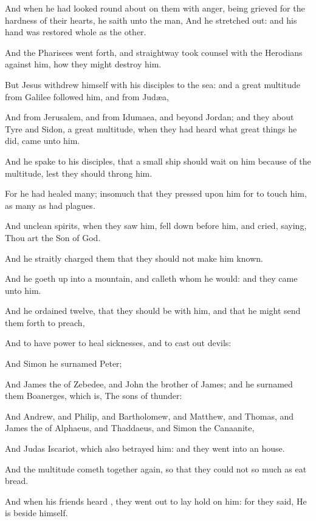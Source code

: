 {And when he had looked round
about on
them
with
anger, being
grieved
for the
hardness
of
their
hearts, he
saith unto the
man,
{}
And he
stretched
{}
out:
and
his
hand was
restored
whole
as the
other.

And the
Pharisees went
forth, and
straightway
took
counsel
with the
Herodians
against
him,
how they might
destroy
him.

But
Jesus withdrew
himself
with
his
disciples
to the
sea:
and a
great
multitude
from
Galilee
followed
him,
and
from
Judæa,

And
from
Jerusalem,
and
from
Idumaea,
and
{}
beyond
Jordan;
and
they
about
Tyre
and
Sidon, a
great
multitude, when they had
heard what great
things he
did,
came
unto
him.

And he
spake
to
his
disciples,
that a small
ship should
wait on
him because
of the
multitude,
lest they should
throng
him.

For he had
healed
many; insomuch
that they pressed
upon
him for
to
touch
him, as many
as
had
plagues.

And
unclean
spirits,
when they
saw
him, fell down
before
him,
and
cried,
saying,
Thou
art the
Son of
God.

And
he
straitly
charged
them
that they
should
not
make
him
known.

And he goeth
up
into a
mountain,
and
calleth
{}
whom
he
would:
and they
came
unto
him.

And he
ordained
twelve,
that they should
be
with
him,
and
that he might
send
them
forth to
preach,

And to
have
power to
heal
sicknesses,
and to cast
out
devils:

And
Simon
he
surnamed Peter;

And
James
the
{} of
Zebedee,
and
John the
brother of
James;
and
he
surnamed
them
Boanerges,
which
is, The
sons of
thunder:

And
Andrew,
and
Philip,
and
Bartholomew,
and
Matthew,
and
Thomas,
and
James
the
{} of
Alphaeus,
and
Thaddaeus,
and
Simon the
Canaanite,

And
Judas
Iscariot,
which
also
betrayed
him:
and they
went
into an
house.

And the
multitude cometh
together
again, so
that
they
could
not so much
as
eat
bread.

And
when
his
friends
heard
{}, they went
out to lay
hold on
him:
for they
said, He is beside
himself.


}
